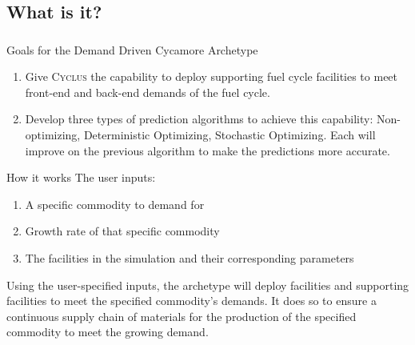 \newcommand{\Cyclus}{\textsc{Cyclus}\xspace}%
\subsection{What is it?}
\begin{frame}
  \frametitle{}

\begin{block}{Goals for the Demand Driven Cycamore Archetype}
\begin{enumerate}
	\item Give \Cyclus the capability to deploy supporting fuel cycle facilities to meet front-end and back-end demands of the fuel cycle. 
	\item Develop three types of prediction algorithms to achieve this capability: Non-optimizing, Deterministic Optimizing, Stochastic Optimizing. Each will improve on the previous algorithm to make the predictions more accurate. 
\end{enumerate}
\end{block}

\begin{block}{How it works}
The user inputs: 
\begin{enumerate}
	\item A specific commodity to demand for
	\item Growth rate of that specific commodity 
	\item The facilities in the simulation and their corresponding parameters
\end{enumerate}
Using the user-specified inputs, the archetype will deploy facilities and supporting facilities to meet the specified commodity's demands. It does so to ensure a continuous supply chain of materials for the production of the specified commodity to meet the growing demand. 
\end{block}


\end{frame}

